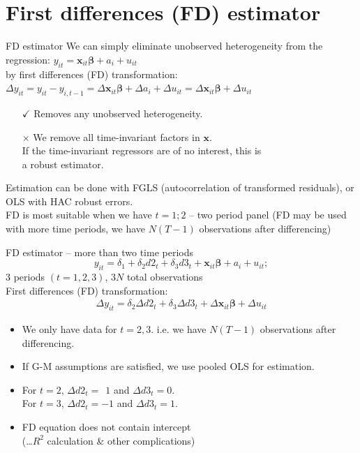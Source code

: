 \documentclass[usenames,dvipsnames]{beamer}
\begin{document}
\section{First differences (FD) estimator}
\begin{frame}{FD estimator}
We can simply eliminate unobserved heterogeneity from the regression: \quad $y_{it} = \bm{x}_{it} \bm{\beta} + a_i + u_{it}$ \\
by first differences (FD) transformation: \\
$\Delta y_{it} = y_{it} - y_{i,t-1} = \Delta \bm{x}_{it} \bm{\beta} + \Delta a_i + \Delta u_{it} = \Delta \bm{x}_{it} \bm{\beta} + \Delta u_{it}$
\begin{itemize}
\item[$\checkmark$] Removes any unobserved heterogeneity.
\item[$\times$] We remove all time-invariant factors in $\bm{x}$.\\
If the time-invariant regressors are of no interest, this is \\a robust estimator.
\end{itemize}
Estimation can be done with FGLS (autocorrelation of transformed residuals), or OLS with HAC robust errors. \\
\medskip
FD is most suitable when we have $t = 1; 2$ – two period panel (FD may be used with more time periods, we have $N(T-1)$ observations after differencing)
\end{frame}
\begin{frame}{FD estimator – more than two time periods}
$$y_{it} = \delta_1 + \delta_2 d2_t + \delta_3 d3_t + \bm{x}_{it} \bm{\beta} + a_i + u_{it};$$
\hfill $3$ periods $(t=1,2,3)$, $3N$ total observations\\
\medskip
First differences (FD) transformation: 
\begin{align}
\label{eq:one}
\Delta y_{it} = \delta_2 \Delta d2_t + \delta_3 \Delta d3_t + \Delta \bm{x}_{it} \bm{\beta} + \Delta u_{it}
\end{align}
\begin{itemize}
\item We only have data for $t = 2,3$. i.e. we have $N(T-1)$ observations after differencing.
\item If G-M assumptions are satisfied, we use pooled OLS for estimation.
\item For $t = 2$, $\Delta d2_t = ~~1$ and $\Delta d3_t = 0$. \\For $t=3$, $\Delta d2_t = -1$ and $\Delta d3_t = 1$. 
\item FD equation does not contain intercept \\(\dots $R^2$ calculation \& other complications)
\end{itemize}
\bigskip
\end{frame}
\end{document}
